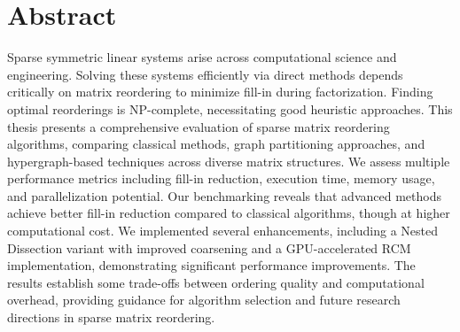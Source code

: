 \chapter*{Abstract}

Sparse symmetric linear systems arise across computational science and engineering. Solving these systems efficiently via direct methods depends critically on matrix reordering to minimize fill-in during factorization. Finding optimal reorderings is NP-complete, necessitating good heuristic approaches. This thesis presents a comprehensive evaluation of sparse matrix reordering algorithms, comparing classical methods, graph partitioning approaches, and hypergraph-based techniques across diverse matrix structures. We assess multiple performance metrics including fill-in reduction, execution time, memory usage, and parallelization potential. Our benchmarking reveals that advanced methods achieve better fill-in reduction compared to classical algorithms, though at higher computational cost. We implemented several enhancements, including a Nested Dissection variant with improved coarsening and a GPU-accelerated RCM implementation, demonstrating significant performance improvements. The results establish some trade-offs between ordering quality and computational overhead, providing guidance for algorithm selection and future research directions in sparse matrix reordering. 
